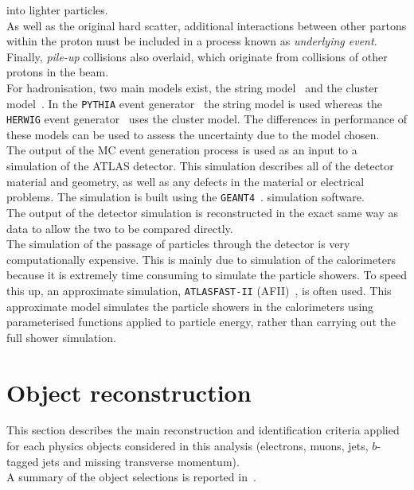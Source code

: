 into lighter particles.\\
As well as the original hard scatter, additional interactions between other partons within the
proton must be included in a process known as \textit{underlying event}.
\newpage
\noindent Finally, \textit{pile-up} collisions also overlaid, which originate from collisions of other
protons in the beam.\\
For hadronisation, two main models exist, the string model~\cite{string} and the cluster 
model~\cite{cluster}. In the \texttt{PYTHIA} event generator~\cite{pythia} the string model is used 
whereas the \texttt{HERWIG} event generator~\cite{herwig} uses the cluster model. The 
differences in performance of these models can be used to assess the uncertainty due to the 
model chosen.\\
The output of the MC event generation process is used as an input to a simulation of the
ATLAS detector. This simulation describes all of the detector material and geometry, as
well as any defects in the material or electrical problems. The simulation is built using the
\texttt{GEANT4}~\cite{geant}. simulation software.\\
The output of the detector simulation is reconstructed in the exact same way as data to allow the 
two to be compared directly.\\
The simulation of the passage of particles through the detector is very computationally expensive.
This is mainly due to simulation of the calorimeters because it is extremely time consuming
to simulate the particle showers. To speed this up, an approximate simulation, 
\texttt{ATLASFAST-II} (AFII)~\cite{afii}, is often used. This approximate model simulates the 
particle showers in the calorimeters using parameterised functions applied to particle energy, 
rather than carrying out the full shower simulation.


\section{Object reconstruction}
This section describes the main reconstruction and identification criteria applied for each physics
objects considered in this analysis (electrons, muons, jets, $b$-tagged jets and missing transverse momentum). \\
A summary of the object selections is reported in~.

